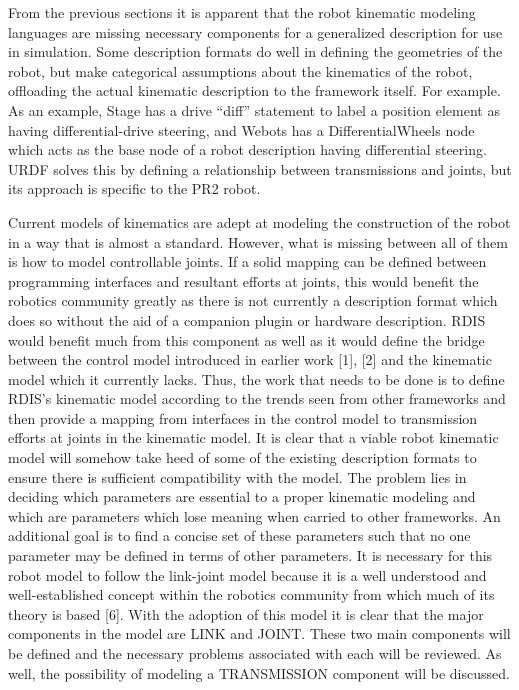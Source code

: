 From the previous sections it is apparent that the robot kinematic modeling languages are missing necessary components for a generalized description for use in simulation. Some description formats do well in defining the geometries of the robot, but make categorical assumptions about the kinematics of the robot, offloading the actual kinematic description to the framework itself. For example. As an example, Stage has a drive ``diff'' statement to label a position element as having differential-drive steering, and Webots has a DifferentialWheels node which acts as the base node of a robot description having differential steering. URDF solves this by defining a relationship between transmissions and joints, but its approach is specific to the PR2 robot.

Current models of kinematics are adept at modeling the construction of the robot in a way that is almost a standard. However, what is missing between all of them is how to model controllable joints. If a solid mapping can be defined between programming interfaces and resultant efforts at joints, this would benefit the robotics community greatly as there is not currently a description format which does so without the aid of a companion plugin or hardware description. RDIS would benefit much from this component as well as it would define the bridge between the control model introduced in earlier work [1], [2] and the kinematic model which it currently lacks. Thus, the work that needs to be done is to define RDIS's kinematic model according to the trends seen from other frameworks and then provide a mapping from interfaces in the control model to transmission efforts at joints in the kinematic model. It is clear that a viable robot kinematic model will somehow take heed of some of the existing description formats to ensure there is sufficient compatibility with the model. The problem lies in deciding which parameters are essential to a proper kinematic modeling and which are parameters which lose meaning when carried to other frameworks. An additional goal is to find a concise set of these parameters such that no one parameter may be defined in terms of other parameters. It is necessary for this robot model to follow the link-joint model because it is a well understood and well-established concept within the robotics community from which much of its theory is based [6]. With the adoption of this model it is clear that the major components in the model are LINK and JOINT. These two main components will be defined and the necessary problems associated with each will be reviewed. As well, the possibility of modeling a TRANSMISSION component will be discussed.

